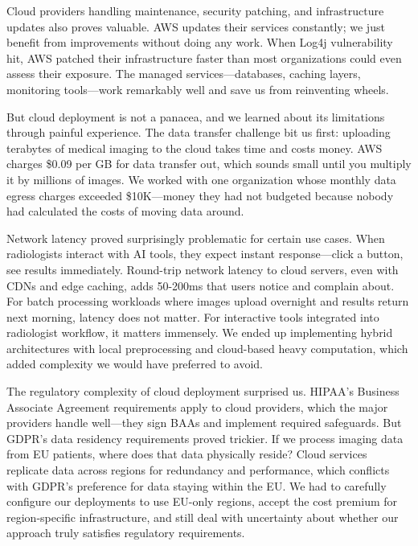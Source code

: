 \documentclass[12pt,a4paper]{article}
\begin{document}
Cloud providers handling maintenance, security patching, and infrastructure updates also proves valuable. AWS updates their services constantly; we just benefit from improvements without doing any work. When Log4j vulnerability hit, AWS patched their infrastructure faster than most organizations could even assess their exposure. The managed services—databases, caching layers, monitoring tools—work remarkably well and save us from reinventing wheels.

But cloud deployment is not a panacea, and we learned about its limitations through painful experience. The data transfer challenge bit us first: uploading terabytes of medical imaging to the cloud takes time and costs money. AWS charges \$0.09 per GB for data transfer out, which sounds small until you multiply it by millions of images. We worked with one organization whose monthly data egress charges exceeded \$10K—money they had not budgeted because nobody had calculated the costs of moving data around.

Network latency proved surprisingly problematic for certain use cases. When radiologists interact with AI tools, they expect instant response—click a button, see results immediately. Round-trip network latency to cloud servers, even with CDNs and edge caching, adds 50-200ms that users notice and complain about. For batch processing workloads where images upload overnight and results return next morning, latency does not matter. For interactive tools integrated into radiologist workflow, it matters immensely. We ended up implementing hybrid architectures with local preprocessing and cloud-based heavy computation, which added complexity we would have preferred to avoid.

The regulatory complexity of cloud deployment surprised us. HIPAA's Business Associate Agreement requirements apply to cloud providers, which the major providers handle well—they sign BAAs and implement required safeguards. But GDPR's data residency requirements proved trickier. If we process imaging data from EU patients, where does that data physically reside? Cloud services replicate data across regions for redundancy and performance, which conflicts with GDPR's preference for data staying within the EU. We had to carefully configure our deployments to use EU-only regions, accept the cost premium for region-specific infrastructure, and still deal with uncertainty about whether our approach truly satisfies regulatory requirements.
\end{document}
